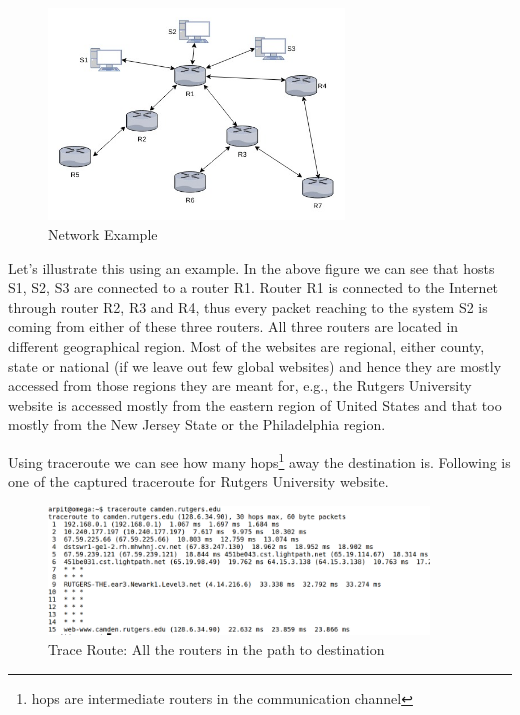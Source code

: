 \documentclass[12pt,oneside,a4paper]{article}
\begin{document}
\begin{figure}[H]
\centering
\includegraphics[width=0.70\textwidth]{routers.jpg}
\caption{Network Example} \label{fig:routers}
\end{figure}

Let's illustrate this using an example. In the above figure we can see that hosts S1, S2, S3 are connected to a router R1. Router R1 is connected to the Internet through router R2, R3 and R4, thus every packet reaching to the system S2 is coming from either of these three routers. All three routers are located in different geographical region. Most of the websites are regional, either county, state or national (if we leave out few global websites) and hence they are mostly accessed from those regions they are meant for, e.g., the Rutgers University website is accessed mostly from the eastern region of United States and that too mostly from the New Jersey State or the Philadelphia region.\par
Using traceroute we can see how many hops\footnote{hops are intermediate routers in the communication channel} away the destination is. Following is one of the captured traceroute for Rutgers University website.\par
\begin{figure}[H]
\centering
\includegraphics[width=0.90\textwidth]{TraceRoute.png}
\caption{Trace Route: All the routers in the path to destination} \label{fig:traceroute}
\end{figure}
\end{document}

